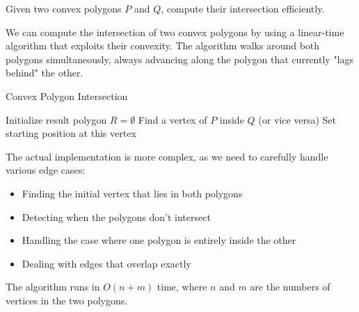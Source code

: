 Given two convex polygons $P$ and $Q$, compute their intersection efficiently.

\begin{intuition}
We can compute the intersection of two convex polygons by using a linear-time algorithm that exploits their convexity. The algorithm walks around both polygons simultaneously, always advancing along the polygon that currently "lags behind" the other.
\end{intuition}

\begin{algorithm}[H]
\SetAlgoLined
\caption{Convex Polygon Intersection}




Initialize result polygon $R = \emptyset$\;
Find a vertex of $P$ inside $Q$ (or vice versa)\;
Set starting position at this vertex\;

\;
\end{algorithm}

\begin{implementation}
The actual implementation is more complex, as we need to carefully handle various edge cases:
\begin{itemize}
    \item Finding the initial vertex that lies in both polygons
    \item Detecting when the polygons don't intersect
    \item Handling the case where one polygon is entirely inside the other
    \item Dealing with edges that overlap exactly
\end{itemize}
\end{implementation}

\begin{complexity}
The algorithm runs in $O(n + m)$ time, where $n$ and $m$ are the numbers of vertices in the two polygons.
\end{complexity}